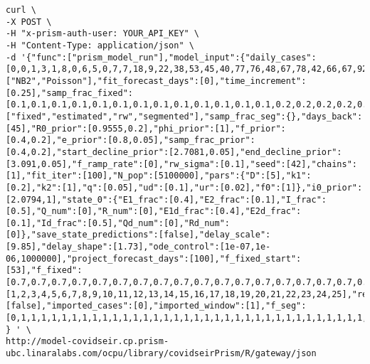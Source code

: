 \documentclass[
]{book}
\begin{document}
\begin{verbatim}
curl \
-X POST \
-H "x-prism-auth-user: YOUR_API_KEY" \
-H "Content-Type: application/json" \
-d '{"func":["prism_model_run"],"model_input":{"daily_cases":[0,0,1,3,1,8,0,6,5,0,7,7,18,9,22,38,53,45,40,77,76,48,67,78,42,66,67,92,16,70,43,53,55,53,29,26,37,25,45,34,40,35],"obs_model":["NB2","Poisson"],"fit_forecast_days":[0],"time_increment":[0.25],"samp_frac_fixed":[0.1,0.1,0.1,0.1,0.1,0.1,0.1,0.1,0.1,0.1,0.1,0.1,0.1,0.2,0.2,0.2,0.2,0.2,0.2,0.2,0.2,0.2,0.2,0.2,0.2,0.2,0.2,0.2,0.2,0.2,0.2,0.2,0.2,0.2,0.2,0.2,0.2,0.2,0.2,0.2,0.2,0.2],"samp_frac_type":["fixed","estimated","rw","segmented"],"samp_frac_seg":{},"days_back":[45],"R0_prior":[0.9555,0.2],"phi_prior":[1],"f_prior":[0.4,0.2],"e_prior":[0.8,0.05],"samp_frac_prior":[0.4,0.2],"start_decline_prior":[2.7081,0.05],"end_decline_prior":[3.091,0.05],"f_ramp_rate":[0],"rw_sigma":[0.1],"seed":[42],"chains":[1],"fit_iter":[100],"N_pop":[5100000],"pars":{"D":[5],"k1":[0.2],"k2":[1],"q":[0.05],"ud":[0.1],"ur":[0.02],"f0":[1]},"i0_prior":[2.0794,1],"state_0":{"E1_frac":[0.4],"E2_frac":[0.1],"I_frac":[0.5],"Q_num":[0],"R_num":[0],"E1d_frac":[0.4],"E2d_frac":[0.1],"Id_frac":[0.5],"Qd_num":[0],"Rd_num":[0]},"save_state_predictions":[false],"delay_scale":[9.85],"delay_shape":[1.73],"ode_control":[1e-07,1e-06,1000000],"project_forecast_days":[100],"f_fixed_start":[53],"f_fixed":[0.7,0.7,0.7,0.7,0.7,0.7,0.7,0.7,0.7,0.7,0.7,0.7,0.7,0.7,0.7,0.7,0.7,0.7,0.7,0.7,0.7,0.7,0.7,0.7,0.7,0.7,0.7,0.7,0.7,0.7,0.7,0.7,0.7,0.7,0.7,0.7,0.7,0.7,0.7,0.7,0.7,0.7,0.7,0.7,0.7,0.7,0.7,0.7,0.7,0.7,0.7,0.7,0.7,0.7,0.7,0.7,0.7,0.7,0.7,0.7,0.2,0.2,0.2,0.2,0.2,0.2,0.2,0.2,0.2,0.2,0.2,0.2,0.2,0.2,0.2,0.2,0.2,0.2,0.2,0.2,0.2,0.2,0.2,0.2,0.2,0.2,0.2,0.2,0.2,0.2],"forecast_iter":[1,2,3,4,5,6,7,8,9,10,11,12,13,14,15,16,17,18,19,20,21,22,23,24,25],"return_states":[false],"imported_cases":[0],"imported_window":[1],"f_seg":[0,1,1,1,1,1,1,1,1,1,1,1,1,1,1,1,1,1,1,1,1,1,1,1,1,1,1,1,1,1,1,1,1,1,1,1,1,1,1,1,1,1,1,1,1,1,1,1,1,1,1,1,1,1,1,1,1,1,1,1,1,1,1,1,1,1,1,1,1,1,1,1,1,1,1,1,1,1,1,1,1,1,1,1,1,1,1,1,1,1,1,1,1,1,1,1,1,1,1,1,1,1,1,1,1,1,1,1,1,1,1,1,1,1,1,1,1,1,1,1,1,1,1,1,1,1,1,1,1,1,1,1,1,1,1,1,1,1,1,1,1,1]} 
} ' \
http://model-covidseir.cp.prism-ubc.linaralabs.com/ocpu/library/covidseirPrism/R/gateway/json
\end{verbatim}
\end{document}
